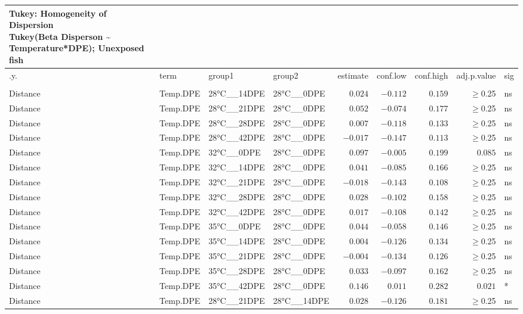 \documentclass[
]{article}
\begin{document}
\begin{longtable}{llllrrrrl}
\caption*{
{\large Tukey: Homogeneity of Dispersion} \\ 
{\small Tukey(Beta Disperson \textasciitilde{} Temperature*DPE); Unexposed fish}
} \\ 
\toprule
.y. & term & group1 & group2 & estimate & conf.low & conf.high & adj.p.value & sig \\ 
\midrule\addlinespace[2.5pt]
\multicolumn{9}{l}{bray} \\ 
\midrule\addlinespace[2.5pt]
Distance & Temp.DPE & 28°C\_\_14DPE & 28°C\_\_0DPE & $0.024$ & $-0.112$ & $0.159$ & $\geq$0.25 & ns \\ 
Distance & Temp.DPE & 28°C\_\_21DPE & 28°C\_\_0DPE & $0.052$ & $-0.074$ & $0.177$ & $\geq$0.25 & ns \\ 
Distance & Temp.DPE & 28°C\_\_28DPE & 28°C\_\_0DPE & $0.007$ & $-0.118$ & $0.133$ & $\geq$0.25 & ns \\ 
Distance & Temp.DPE & 28°C\_\_42DPE & 28°C\_\_0DPE & $-0.017$ & $-0.147$ & $0.113$ & $\geq$0.25 & ns \\ 
Distance & Temp.DPE & 32°C\_\_0DPE & 28°C\_\_0DPE & $0.097$ & $-0.005$ & $0.199$ & $0.085$ & ns \\ 
Distance & Temp.DPE & 32°C\_\_14DPE & 28°C\_\_0DPE & $0.041$ & $-0.085$ & $0.166$ & $\geq$0.25 & ns \\ 
Distance & Temp.DPE & 32°C\_\_21DPE & 28°C\_\_0DPE & $-0.018$ & $-0.143$ & $0.108$ & $\geq$0.25 & ns \\ 
Distance & Temp.DPE & 32°C\_\_28DPE & 28°C\_\_0DPE & $0.028$ & $-0.102$ & $0.158$ & $\geq$0.25 & ns \\ 
Distance & Temp.DPE & 32°C\_\_42DPE & 28°C\_\_0DPE & $0.017$ & $-0.108$ & $0.142$ & $\geq$0.25 & ns \\ 
Distance & Temp.DPE & 35°C\_\_0DPE & 28°C\_\_0DPE & $0.044$ & $-0.058$ & $0.146$ & $\geq$0.25 & ns \\ 
Distance & Temp.DPE & 35°C\_\_14DPE & 28°C\_\_0DPE & $0.004$ & $-0.126$ & $0.134$ & $\geq$0.25 & ns \\ 
Distance & Temp.DPE & 35°C\_\_21DPE & 28°C\_\_0DPE & $-0.004$ & $-0.134$ & $0.126$ & $\geq$0.25 & ns \\ 
Distance & Temp.DPE & 35°C\_\_28DPE & 28°C\_\_0DPE & $0.033$ & $-0.097$ & $0.162$ & $\geq$0.25 & ns \\ 
Distance & Temp.DPE & 35°C\_\_42DPE & 28°C\_\_0DPE & $0.146$ & $0.011$ & $0.282$ & $0.021$ & * \\ 
Distance & Temp.DPE & 28°C\_\_21DPE & 28°C\_\_14DPE & $0.028$ & $-0.126$ & $0.181$ & $\geq$0.25 & ns \\ 

\end{longtable}
\end{document}
